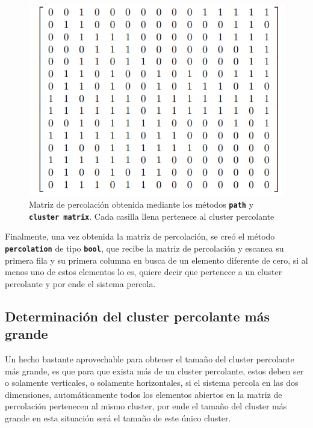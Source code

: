 \documentclass[11pt,twocolumn]{article}
\begin{document}
\begin{figure}[H]
    \centering
    \includegraphics[scale=0.5]{Imagenes/matriz2.png}
    \caption{Matriz de percolación obtenida mediante los métodos \textbf{\texttt{path}} y \texttt{\textbf{cluster matrix}}. Cada casilla llena pertenece al cluster percolante}
    \label{hood1}
\end{figure}

Finalmente, una vez obtenida la matriz de percolación, se creó el método \texttt{\textbf{percolation}} de tipo \texttt{\textbf{bool}}, que recibe la matriz de percolación y escanea su primera fila y su primera columna en busca de un elemento diferente de cero, si al menos uno de estos elementos lo es, quiere decir que pertenece a un cluster percolante y por ende el sistema percola.




\subsection{\textbf{Determinación del cluster percolante más grande}}

Un hecho bastante aprovechable para obtener el tamaño del cluster percolante más grande, es que para que exista más de un cluster percolante, estos deben ser o solamente verticales, o solamente horizontales, si el sistema percola en las dos dimensiones, automáticamente todos los elementos abiertos en la matriz de percolación pertenecen al mismo cluster, por ende el tamaño del cluster más grande en esta situación será el tamaño de este único cluster.
\vspace{0.2 cm}
\end{document}
